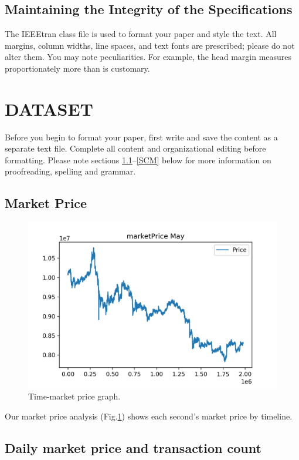 \documentclass[conference]{IEEEtran}
\begin{document}
\subsection{Maintaining the Integrity of the Specifications}

The IEEEtran class file is used to format your paper and style the text. All margins, 
column widths, line spaces, and text fonts are prescribed; please do not 
alter them. You may note peculiarities. For example, the head margin
measures proportionately more than is customary. 

\section{DATASET}
Before you begin to format your paper, first write and save the content as a 
separate text file. Complete all content and organizational editing before 
formatting. Please note sections \ref{AA}--\ref{SCM} below for more information on 
proofreading, spelling and grammar.

\subsection{Market Price}\label{AA}

\begin{figure}[htbp]
\centerline{\includegraphics[scale=0.4]{marketPriceMay.png}}
\caption{Time-market price graph.}
\label{fig}
\end{figure}

Our market price analysis (Fig.\ref{fig}) shows each second's market price by timeline. 

\subsection{Daily market price and transaction count}
\end{document}
